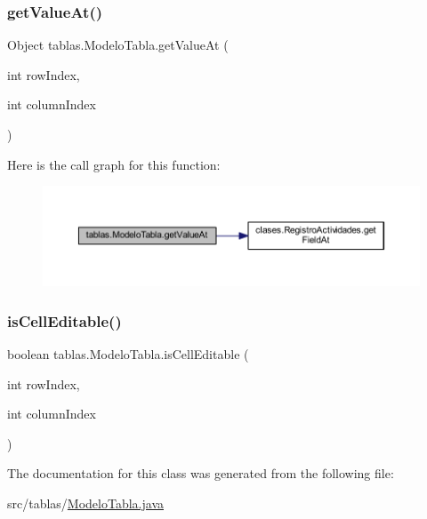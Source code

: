 \mbox{\label{classtablas_1_1_modelo_tabla_a4b26a3776637f75bac9ba3d5c06d7640}} 
\subsubsection{\texorpdfstring{get\+Value\+At()}{getValueAt()}}
{\footnotesize\ttfamily Object tablas.\+Modelo\+Tabla.\+get\+Value\+At (\begin{DoxyParamCaption}\item[{int}]{row\+Index,  }\item[{int}]{column\+Index }\end{DoxyParamCaption})}

Here is the call graph for this function\+:
\nopagebreak
\begin{figure}[H]
\begin{center}
\leavevmode
\includegraphics[width=350pt]{classtablas_1_1_modelo_tabla_a4b26a3776637f75bac9ba3d5c06d7640_cgraph}
\end{center}
\end{figure}
\mbox{\label{classtablas_1_1_modelo_tabla_add22b2987d0ff8b8b517c11a6aa72fe2}} 
\subsubsection{\texorpdfstring{is\+Cell\+Editable()}{isCellEditable()}}
{\footnotesize\ttfamily boolean tablas.\+Modelo\+Tabla.\+is\+Cell\+Editable (\begin{DoxyParamCaption}\item[{int}]{row\+Index,  }\item[{int}]{column\+Index }\end{DoxyParamCaption})}



The documentation for this class was generated from the following file\+:\begin{DoxyCompactItemize}
\item 
src/tablas/\mbox{\hyperlink{_modelo_tabla_8java}{Modelo\+Tabla.\+java}}\end{DoxyCompactItemize}
